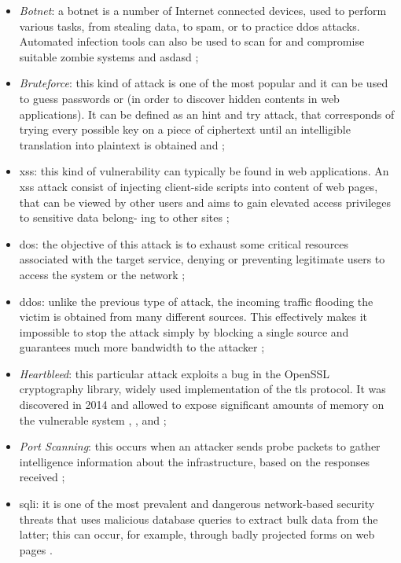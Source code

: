 \begin{itemize}
    \item[\faCaretRight] \textit{Botnet}: a botnet is a number of Internet connected devices, used to perform various tasks, from stealing data, to spam, or to practice \gls{ddos} attacks. Automated infection tools can also be used to scan for and compromise suitable zombie systems \cite{icissp18} and \cite[p.~250]{Sharafaldin2019} asdasd \citep[{\fontsize{8}{8}\faBookmark[regular]}][p.~250]{Sharafaldin2019};
    \item[\faCaretRight] \textit{Bruteforce}: this kind of attack is one of the most popular and it can be used to guess passwords or  (in order to discover hidden contents in web applications). It can be defined as an hint and try attack, that corresponds of trying every possible key on a piece of ciphertext until an intelligible translation into plaintext is obtained \cite{icissp18} and \cite[p.~43]{Sharafaldin2019};
    \item[\faCaretRight] \gls{xss}: this kind of vulnerability can typically be found in web applications. An \gls{xss} attack consist of injecting client-side scripts into  content of web pages, that can be viewed by other users and aims to gain elevated access privileges to sensitive data belong- ing to other sites \cite[p.~387]{Sharafaldin2019};
    \item[\faCaretRight] \gls{dos}: the objective of this attack is to exhaust some critical resources associated with the target service, denying or preventing legitimate users to access the system or the network \cite[p.~241]{Sharafaldin2019};
    \item[\faCaretRight] \gls{ddos}: unlike the previous type of attack, the incoming traffic flooding the victim is obtained from many different sources. This effectively makes it impossible to stop the attack simply by blocking a single source and guarantees much more bandwidth to the attacker \cite[p.~241]{Sharafaldin2019};
    \item[\faCaretRight] \textit{Heartbleed}: this particular attack exploits a bug in the OpenSSL cryptography library, widely used implementation of the \gls{tls} protocol. It was discovered in 2014 and allowed to expose significant amounts of memory on the vulnerable system \cite{Carvalho2014}, \cite{icissp18}, \cite{Stallings2014} and \cite[p.~706]{Sharafaldin2019};
    \item[\faCaretRight] \textit{Port Scanning}: this occurs when an attacker sends probe packets to gather intelligence information about the infrastructure, based on the responses received \cite{icissp18};
    \item[\faCaretRight] \gls{sqli}: it is one of the most prevalent and dangerous network-based security threats that uses malicious database queries to extract bulk data from the latter; this can occur, for example, through badly projected forms on web pages \cite[p.~163]{Sharafaldin2019}.
\end{itemize}
